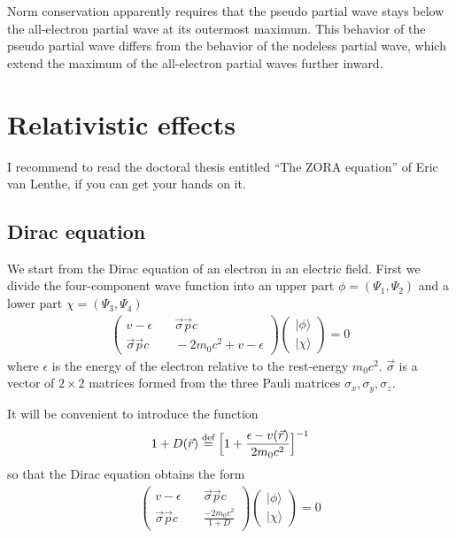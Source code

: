 \documentclass[11pt,a4paper]{report}
\begin{document}
Norm conservation apparently requires that the pseudo partial wave
stays below the all-electron partial wave at its outermost
maximum. This behavior of the pseudo partial wave differs from the
behavior of the nodeless partial wave, which extend the maximum of the
all-electron partial waves further inward.


\section{Relativistic effects}
I recommend to read the doctoral thesis entitled ``The ZORA equation''
of Eric van Lenthe\cite{lenthe96_thesis}, if you can get your hands on
it.


\subsection{Dirac equation}
We start from the Dirac equation of an electron in an electric field.
First we divide the four-component wave function into an upper part
$\phi=(\Psi_1,\Psi_2)$ and a lower part $\chi=(\Psi_3,\Psi_4)$
\begin{eqnarray}
\left(\begin{array}{cc}
v-\epsilon &\quad \vec{\sigma}\vec{p}c\\
\vec{\sigma}\vec{p}c &\quad -2m_0c^2+v-\epsilon\end{array}\right)
\left(\begin{array}{c}|\phi\rangle\\|\chi\rangle\end{array}\right)=0
\label{eq:dirac2by2withepsilon}
\end{eqnarray}
where $\epsilon$ is the energy of the electron relative to the
rest-energy $m_0c^2$. $\vec{\sigma}$ is a vector of $2\times2$
matrices formed from the three Pauli matrices
$\sigma_x,\sigma_y,\sigma_z$.

It will be convenient to introduce the function
\begin{eqnarray}
1+D(\vec{r})\stackrel{\text{def}}{=}\Bigl[1+\frac{\epsilon-v(\vec{r})}{2m_0c^2}\Bigr]^{-1}
\label{eq:defrelativisticfactor}
\end{eqnarray}
so that the Dirac equation obtains the form
\begin{eqnarray}
\left(\begin{array}{cc}
v-\epsilon &\quad \vec{\sigma}\vec{p}c\\
\vec{\sigma}\vec{p}c &\quad \frac{-2m_0c^2}{1+D}\end{array}\right)
\left(\begin{array}{c}|\phi\rangle\\|\chi\rangle\end{array}\right)=0
\label{eq:dirac2by2withepsilonb}
\end{eqnarray}
\end{document}
